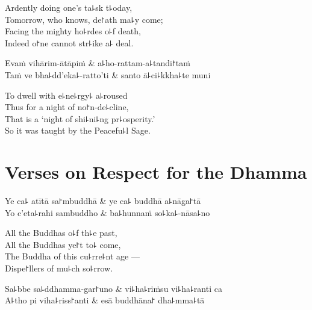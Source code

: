 \begin{english}
  Ardently doing one's ta꜕sk t꜕oday,\\
  Tomorrow, who knows, de꜓ath ma꜕y come;\\
  Facing the mighty ho꜕rdes o꜕f death,\\
  Indeed o꜓ne cannot str꜕ike a꜕ deal.
\end{english}

\clearpage

\begin{twochants}
  Evaṁ vihārim-ātāpiṁ & a꜕ho-rattam-a꜕tandi꜓taṁ \\
  Taṁ ve bha꜕dd'eka꜕-ratto'ti & santo ā꜕ci꜕kkha꜕te muni \\
\end{twochants}

\begin{english}
  To dwell with e꜕ne꜕rgy꜕ a꜕roused\\
  Thus for a night of no꜓n-de꜕cline,\\
  That is a `night of shi꜕ni꜕ng pr꜕osperity.'\\
  So it was taught by the Peacefu꜕l Sage.
\end{english}

\chapter{Verses on Respect for the Dhamma}%


\begin{leader}
\end{leader}

\begin{twochants}
  Ye ca꜕ atītā sa꜓mbuddhā & ye ca꜕ buddhā a꜕nāga꜓tā \\
  Yo c'eta꜕rahi sambuddho & ba꜕hunnaṁ so꜕ka꜕-nāsa꜕no \\
\end{twochants}

\begin{english}
  All the Buddhas o꜕f th꜕e past,\\
  All the Buddhas ye꜓t to꜕ come,\\
  The Buddha of this cu꜕rre꜕nt age ---\\
  Dispe꜓llers of mu꜕ch so꜕rrow.
\end{english}

\begin{twochants}
  Sa꜕bbe sa꜕ddhamma-gar꜓uno & vi꜕ha꜕riṁsu vi꜕ha꜕ranti ca \\
  A꜕tho pi viha꜕riss꜓anti & esā buddhāna꜓ dha꜕mma꜕tā \\
\end{twochants}


